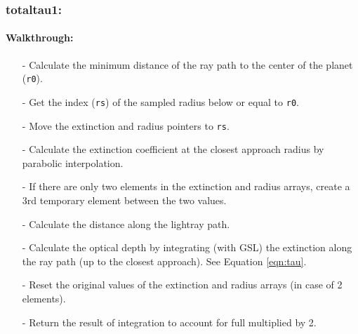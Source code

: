 \documentclass[letterpaper,12pt]{article}
\begin{document}
 \newline

 \newline

 \newline


\subsubsection{totaltau1:}
\paragraph{Walkthrough:}
\begin{enumerate}[leftmargin=10pt, noitemsep, parsep=0pt, topsep=0ex]
\item[-] Calculate the minimum distance of the ray path to the center
  of the planet ({\tt r0}).
\item[-] Get the index ({\tt rs}) of the sampled radius below or equal
  to {\tt r0}.
\item[-] Move the extinction and radius pointers to {\tt rs}.
\item[-] Calculate the extinction coefficient at the closest approach
  radius by parabolic interpolation.
\item[-] If there are only two elements in the extinction and radius
  arrays, create a 3rd temporary element between the two values.
\item[-] Calculate the distance along the lightray path.
\item[-] Calculate the optical depth by integrating (with GSL) the
  extinction along the ray path (up to the closest approach). See Equation \ref{eqn:tau}.
\item[-] Reset the original values of the extinction and radius arrays
  (in case of 2 elements).
\item[-] Return the result of integration to account for full
 multiplied by 2.
\end{enumerate}
\end{document}
